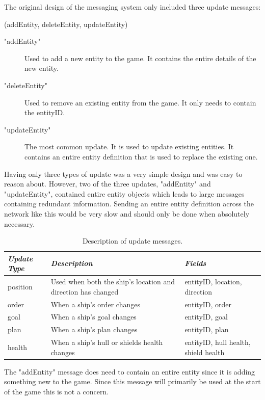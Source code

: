 The original design of the messaging system only included three update messages:

\functions(addEntity, deleteEntity, updateEntity)
\begin{description}
	\item["addEntity"] Used to add a new entity to the game. It contains the entire details of the new entity.
	\item["deleteEntity"] Used to remove an existing entity from the game. It only needs to contain the entityID.
	\item["updateEntity"] The most common update. It is used to update existing entities. It contains an entire entity definition that is used to replace the existing one.
\end{description}

Having only three types of update was a very simple design and was easy to reason about. However, two of the three updates, "addEntity" and "updateEntity", contained entire entity objects which leads to large messages containing redundant information. Sending an entire entity definition across the network like this would be very slow and should only be done when absolutely necessary.

\begin{table}[t]
    \begin{tabular}{p{5em} p{15em} p{6em}}
    \toprule
    \emph{Update Type} & \emph{Description} & \emph{Fields} \\
    \midrule
    position & Used when both the ship's location and direction has changed & entityID, location, direction \\
    order & When a ship's order changes & entityID, order \\
    goal & When a ship's goal changes & entityID, goal \\
    plan & When a ship's plan changes & entityID, plan \\
    health & When a ship's hull or shields health changes & entityID, hull health, shield health \\ 
    \bottomrule
    \end{tabular}
    	\vspace{1em}
	\caption[Description of update messages]{Description of update messages.}
	\label{tab:updateMessageTypes}
\end{table}

The "addEntity" message does need to contain an entire entity since it is adding something new to the game. Since this message will primarily be used at the start of the game this is not a concern.

